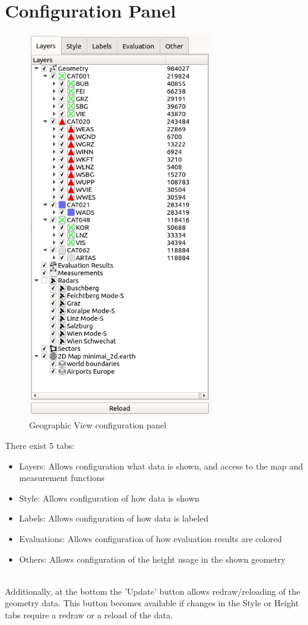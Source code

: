 \section{Configuration Panel}
\label{sec:geoview_config_panel}

\begin{figure}[H]
    \includegraphics[width=8cm,frame]{figures/geoview_config_panel.png}
  \caption{Geographic View configuration panel}
\end{figure}

There exist 5 tabs:
\begin{itemize}
 \item Layers: Allows configuration what data is shown, and access to the map and measurement functions
 \item Style: Allows configuration of how data is shown
 \item Labels: Allows configuration of how data is labeled
 \item Evaluations: Allows configuration of how evaluation results are colored
 \item Others: Allows configuration of the height usage in the shown geometry
\end{itemize}
\ \\

Additionally, at the bottom the 'Update' button allows redraw/reloading of the geometry data. This button becomes available if changes in the Style or Height tabs require a redraw or a reload of the data. \\


 
 
 
